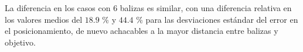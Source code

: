 La diferencia en los casos con 6 balizas es similar, con una diferencia relativa en los valores medios del $18.9$ \% y $44.4$ \% para las desviaciones estándar del error en el posicionamiento, de nuevo achacables a la mayor distancia entre balizas y objetivo.

